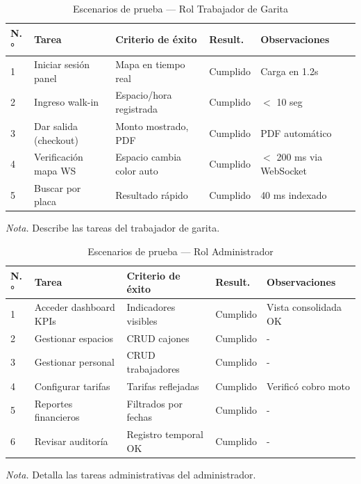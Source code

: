 \begin{table}[htbp]
\caption{Escenarios de prueba — Rol Trabajador de Garita}
\label{tab:uat_trabajador}
\begin{tabular}{@{}p{0.5cm} p{3.7cm} p{4cm} p{1.8cm} p{4.5cm}@{}}
\toprule
\textbf{N.°} & \textbf{Tarea} & \textbf{Criterio de éxito} & \textbf{Result.} & \textbf{Observaciones} \\
\midrule
1 & Iniciar sesión panel & Mapa en tiempo real & Cumplido & Carga en 1.2s \\
2 & Ingreso walk-in & Espacio/hora registrada & Cumplido & $<$ 10 seg \\
3 & Dar salida (checkout) & Monto mostrado, PDF & Cumplido & PDF automático \\
4 & Verificación mapa WS & Espacio cambia color auto & Cumplido & $<$ 200 ms via WebSocket \\
5 & Buscar por placa & Resultado rápido & Cumplido & 40 ms indexado \\
\bottomrule
\end{tabular}
\par\vspace{0.2cm}
\textit{Nota.} Describe las tareas del trabajador de garita.
\end{table}

\begin{table}[htbp]
\caption{Escenarios de prueba — Rol Administrador}
\label{tab:uat_admin}
\begin{tabular}{@{}p{0.5cm} p{3.7cm} p{4cm} p{1.8cm} p{4.5cm}@{}}
\toprule
\textbf{N.°} & \textbf{Tarea} & \textbf{Criterio de éxito} & \textbf{Result.} & \textbf{Observaciones} \\
\midrule
1 & Acceder dashboard KPIs & Indicadores visibles & Cumplido & Vista consolidada OK \\
2 & Gestionar espacios & CRUD cajones & Cumplido & - \\
3 & Gestionar personal & CRUD trabajadores & Cumplido & - \\
4 & Configurar tarifas & Tarifas reflejadas & Cumplido & Verificó cobro moto \\
5 & Reportes financieros & Filtrados por fechas & Cumplido & - \\
6 & Revisar auditoría & Registro temporal OK & Cumplido & - \\
\bottomrule
\end{tabular}
\par\vspace{0.2cm}
\textit{Nota.} Detalla las tareas administrativas del administrador.
\end{table}

